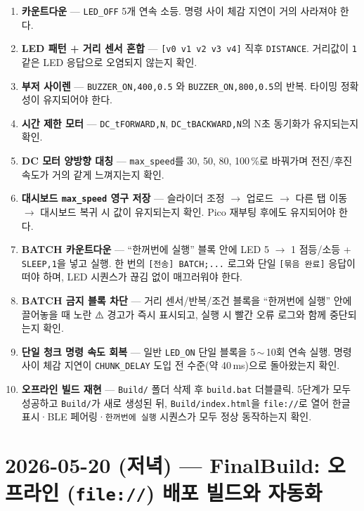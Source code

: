 \documentclass[11pt, oneside]{article}
\begin{document}
\begin{enumerate}
  \item \textbf{카운트다운} --- \texttt{LED\_OFF} 5개 연속 소등. 명령
        사이 체감 지연이 거의 사라져야 한다.
  \item \textbf{LED 패턴 + 거리 센서 혼합} --- \texttt{[v0 v1 v2 v3 v4]}
        직후 \texttt{DISTANCE}. 거리값이 \texttt{1} 같은 LED 응답으로
        오염되지 않는지 확인.
  \item \textbf{부저 사이렌} --- \texttt{BUZZER\_ON,400,0.5} 와
        \texttt{BUZZER\_ON,800,0.5}의 반복. 타이밍 정확성이 유지되어야
        한다.
  \item \textbf{시간 제한 모터} --- \texttt{DC\_tFORWARD,N},
        \texttt{DC\_tBACKWARD,N}의 N초 동기화가 유지되는지 확인.
  \item \textbf{DC 모터 양방향 대칭} --- \texttt{max\_speed}를 30, 50,
        80, 100\,\%로 바꿔가며 전진/후진 속도가 거의 같게 느껴지는지
        확인.
  \item \textbf{대시보드 \texttt{max\_speed} 영구 저장} --- 슬라이더
        조정 $\rightarrow$ 업로드 $\rightarrow$ 다른 탭 이동 $\rightarrow$ 대시보드 복귀 시
        값이 유지되는지 확인. Pico 재부팅 후에도 유지되어야 한다.
  \item \textbf{BATCH 카운트다운} --- ``한꺼번에 실행'' 블록 안에 LED 5
        $\rightarrow$ 1 점등/소등 + \texttt{SLEEP,1}을 넣고 실행. 한 번의
        \texttt{[전송] BATCH;...} 로그와 단일 \texttt{[묶음 완료]} 응답이
        떠야 하며, LED 시퀀스가 끊김 없이 매끄러워야 한다.
  \item \textbf{BATCH 금지 블록 차단} --- 거리 센서/반복/조건 블록을
        ``한꺼번에 실행'' 안에 끌어놓을 때 노란 ⚠️ 경고가 즉시 표시되고,
        실행 시 빨간 오류 로그와 함께 중단되는지 확인.
  \item \textbf{단일 청크 명령 속도 회복} --- 일반 \texttt{LED\_ON} 단일
        블록을 5\,$\sim$\,10회 연속 실행. 명령 사이 체감 지연이 \texttt{CHUNK\_DELAY}
        도입 전 수준(약 40\,ms)으로 돌아왔는지 확인.
  \item \textbf{오프라인 빌드 재현} --- \texttt{Build/} 폴더 삭제 후
        \texttt{build.bat} 더블클릭. 5단계가 모두 성공하고 \texttt{Build/}가
        새로 생성된 뒤, \texttt{Build/index.html}을 \texttt{file://}로 열어
        한글 표시·BLE 페어링·\texttt{한꺼번에 실행} 시퀀스가 모두 정상
        동작하는지 확인.
\end{enumerate}

\section{2026-05-20 (저녁) --- FinalBuild: 오프라인 (\texttt{file://}) 배포 빌드와 자동화}
\end{document}
